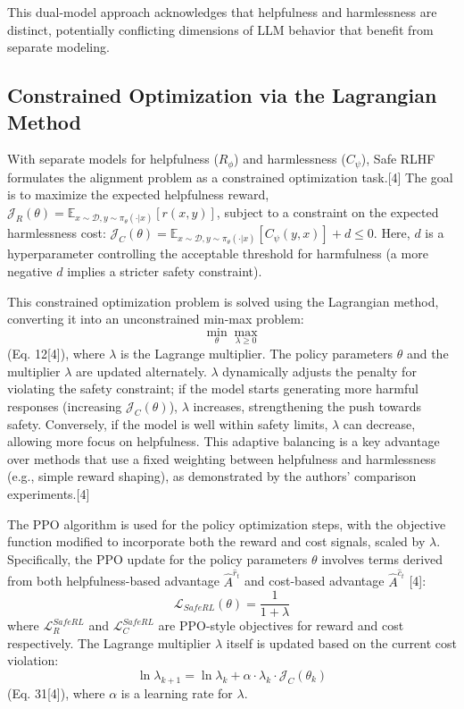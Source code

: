 \documentclass[10pt,journal,compsoc]{IEEEtran} %
\begin{document}
This dual-model approach acknowledges that helpfulness and harmlessness are distinct, potentially conflicting dimensions of LLM behavior that benefit from separate modeling.

\subsection{Constrained Optimization via the Lagrangian Method}
With separate models for helpfulness ($R_\phi$) and harmlessness ($C_\psi$), Safe RLHF formulates the alignment problem as a constrained optimization task.[4] The goal is to maximize the expected helpfulness reward, $\mathcal{J}_R(\theta) = \mathbb{E}_{x \sim \mathcal{D}, y \sim \pi_\theta(\cdot|x)}[r(x,y)]$, subject to a constraint on the expected harmlessness cost: $\mathcal{J}_C(\theta) = \mathbb{E}_{x \sim \mathcal{D}, y \sim \pi_\theta(\cdot|x)}[C_\psi(y,x)] + d \le 0$. Here, $d$ is a hyperparameter controlling the acceptable threshold for harmfulness (a more negative $d$ implies a stricter safety constraint).

This constrained optimization problem is solved using the Lagrangian method, converting it into an unconstrained min-max problem:
$$ \min_{\theta} \max_{\lambda \ge 0} $$
(Eq. 12[4]), where $\lambda$ is the Lagrange multiplier. The policy parameters $\theta$ and the multiplier $\lambda$ are updated alternately. $\lambda$ dynamically adjusts the penalty for violating the safety constraint; if the model starts generating more harmful responses (increasing $\mathcal{J}_C(\theta)$), $\lambda$ increases, strengthening the push towards safety. Conversely, if the model is well within safety limits, $\lambda$ can decrease, allowing more focus on helpfulness. This adaptive balancing is a key advantage over methods that use a fixed weighting between helpfulness and harmlessness (e.g., simple reward shaping), as demonstrated by the authors' comparison experiments.[4]

The PPO algorithm is used for the policy optimization steps, with the objective function modified to incorporate both the reward and cost signals, scaled by $\lambda$. Specifically, the PPO update for the policy parameters $\theta$ involves terms derived from both helpfulness-based advantage $\hat{A}^{\hat{r}_t}$ and cost-based advantage $\hat{A}^{\hat{c}_t}$ [4]:
$$ \mathcal{L}_{SafeRL}(\theta) = \frac{1}{1+\lambda} $$
where $\mathcal{L}_{R}^{SafeRL}$ and $\mathcal{L}_{C}^{SafeRL}$ are PPO-style objectives for reward and cost respectively. The Lagrange multiplier $\lambda$ itself is updated based on the current cost violation:
$$ \ln \lambda_{k+1} = \ln \lambda_k + \alpha \cdot \lambda_k \cdot \mathcal{J}_C(\theta_k) $$
(Eq. 31[4]), where $\alpha$ is a learning rate for $\lambda$.
\end{document}
